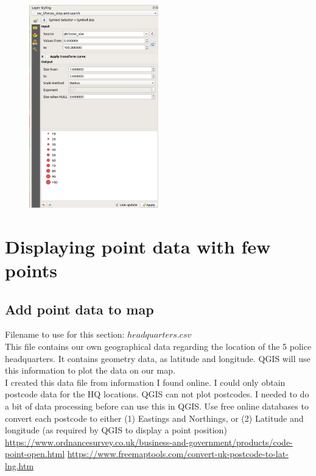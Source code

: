 \begin{figure}[!h]
	\centering
	\includegraphics[width=0.5\textwidth]{images/point_clustering_cluster_size.png}
	\caption{}
	\label{ft_fig_firstfig3}
\end{figure}


\section{Displaying point data with few points}

\subsection{Add point data to map}
Filename to use for this section: $headquarters.csv$\\

This file contains our own geographical data regarding the location of the 5 police headquarters. It contains geometry data, as latitude and longitude. QGIS will use this information to plot the data on our map.\\

I created this data file from information I found online. I could only obtain postcode data for the HQ locations. QGIS can not plot postcodes. I needed to do a bit of data processing before can use this in QGIS.  Use free online databases to convert each postcode to either (1) Eastings and Northings, or (2) Latitude and longitude (as required by QGIS to display a point position)\\

\url{https://www.ordnancesurvey.co.uk/business-and-government/products/code-point-open.html}
\url{https://www.freemaptools.com/convert-uk-postcode-to-lat-lng.htm}

